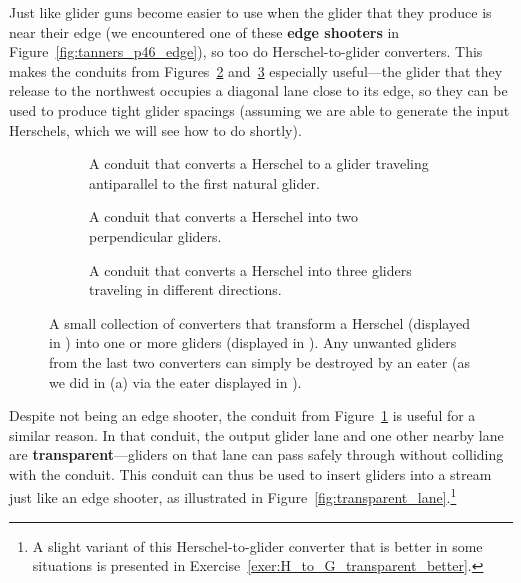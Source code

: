 Just like glider guns become easier to use when the glider that they produce is near their edge (we encountered one of these \textbf{edge shooters} in Figure~\ref{fig:tanners_p46_edge}), so too do Herschel-to-glider converters. This makes the conduits from Figures~\ref{fig:H_to_2G} and~\ref{fig:H_to_3G} especially useful---the glider that they release to the northwest occupies a diagonal lane close to its edge, so they can be used to produce tight glider spacings (assuming we are able to generate the input Herschels, which we will see how to do shortly).

\begin{figure}[!htb]
	\centering
	\begin{subfigure}{.315\textwidth}
		\centering\vspace*{1.23cm}
		\caption{A conduit that converts a Herschel to a glider traveling antiparallel to the first natural glider.}
		\label{fig:H_to_G}
	\end{subfigure} \hfill %
	\begin{subfigure}{.315\textwidth}
		\centering{}
		\caption{A conduit that converts a Herschel into two perpendicular gliders.}
		\label{fig:H_to_2G}
	\end{subfigure} \hfill %
	\begin{subfigure}{.315\textwidth}
		\centering{}
		\caption{A conduit that converts a Herschel into three gliders traveling in different directions.}
		\label{fig:H_to_3G}
	\end{subfigure}
	\caption{A small collection of converters that transform a Herschel (displayed in ) into one or more gliders (displayed in ). Any unwanted gliders from the last two converters can simply be destroyed by an eater (as we did in (a) via the eater displayed in ).}\label{fig:herschel_to_glider}
\end{figure}

Despite not being an edge shooter, the conduit from Figure~\ref{fig:H_to_G} is useful for a similar reason. In that conduit, the output glider lane and one other nearby lane are \textbf{transparent}---gliders on that lane can pass safely through without colliding with the conduit. This conduit can thus be used to insert gliders into a stream just like an edge shooter, as illustrated in Figure~\ref{fig:transparent_lane}.\footnote{A slight variant of this Herschel-to-glider converter that is better in some situations is presented in Exercise~\ref{exer:H_to_G_transparent_better}.}

